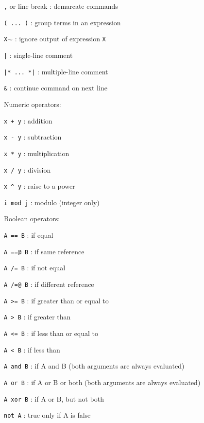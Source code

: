 \documentclass{article}
\begin{document}
\small

\noindent
\begin{description}
\item{\verb#,# or line break} :  demarcate commands
\item{\verb#( ... )#} :  group terms in an expression
\item{\verb#X#$\sim$} :  ignore output of expression \verb#X#
\item{\verb#|#} :  single-line comment
\item{\verb#|* ... *|#} :  multiple-line comment
\item{\verb#&#} :  continue command on next line\\
\end{description}

\noindent
Numeric operators:
\begin{description}
\item{\verb#x + y#} :  addition
\item{\verb#x - y#} :  subtraction
\item{\verb#x * y#} :  multiplication
\item{\verb#x / y#} :  division
\item{\verb#x ^ y#} :  raise to a power
\item{\verb#i mod j#} :  modulo (integer only)\\
\end{description}

\noindent
Boolean operators:
\begin{description}
\item{\verb#A == B#} :  if equal
\item{\verb#A ==@ B#} :  if same reference
\item{\verb#A /= B#} :  if not equal
\item{\verb#A /=@ B#} :  if different reference
\item{\verb#A >= B#} :  if greater than or equal to
\item{\verb#A > B#} :  if greater than
\item{\verb#A <= B#} :  if less than or equal to
\item{\verb#A < B#} :  if less than
\item{\verb#A and B#} :  if A and B (both arguments are always evaluated)
\item{\verb#A or B#} :  if A or B or both (both arguments are always evaluated)
\item{\verb#A xor B#} :  if A or B, but not both
\item{\verb#not A#} :  true only if A is false\\
\end{description}
\end{document}
